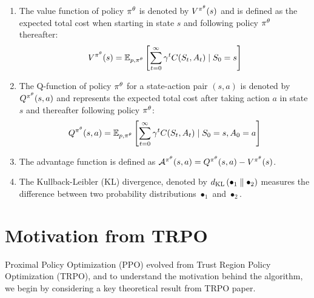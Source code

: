 \documentclass[12pt,twoside]{../../mitthesis}
\begin{document}
\begin{enumerate}
    \item The value function of policy $\policy^{\theta}$ is denoted by $V^{\policy^{\theta}}(s)$ and is defined as the expected total cost when starting in state $s$ and following policy $\policy^{\theta}$ thereafter:
    $$
    \Value^{\policy^{\theta}}(s) =  \E[\transit, \policy^{\theta}]{\sum_{t = 0}^{\infty} \gamma ^ t \Cost(\State_{t}, \Action_{t}) \mid \State_0 = \state}
    $$ 
    \item The Q-function of policy $\policy^{\theta}$ for a state-action pair $(s, a)$ is denoted by $Q^{\policy^{\theta}}(s, a)$ and represents the expected total cost after taking action $a$ in state $s$ and thereafter following policy $\policy^{\theta}$: 
    $$
    Q^{\policy^{\theta}}(s, a) = \E[\transit, \policy^{\theta}]{\sum_{t = 0}^{\infty} \gamma ^ t \Cost(\State_{t}, \Action_{t}) \mid \State_0 = \state, \Action_0 = \action}
    $$
    \item The advantage function is defined as $\Advan^{\policy^{\theta}}(s, a) = Q^{\policy^{\theta}}(s, a) - \Value^{\policy^{\theta}}(s)$.
    \item The Kullback-Leibler (KL) divergence, denoted by $\kldiv{\bullet_1}{\bullet_2}$ measures the difference between two probability distributions $\bullet_1$ and $\bullet_2$.
\end{enumerate}


\section*{Motivation from TRPO}

Proximal Policy Optimization (PPO) evolved from Trust Region Policy Optimization (TRPO), and to understand the motivation behind the algorithm, we begin by considering a key theoretical result from TRPO paper.
\end{document}
